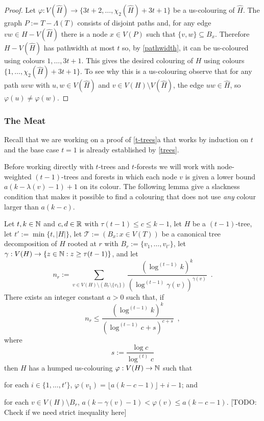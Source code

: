 \documentclass[kpfonts]{patmorin}
\newcommand{\uqs}{\chi_2}
\theoremstyle{named}
\newcommand{\weirdref}[2]{\cref{#1}#2}
\begin{document}
\begin{proof}
    Let $\varphi:V(\hat{H})\to \{3t+2,\ldots,\uqs(\hat{H})+3t+1\}$ be a us-colouring of $\hat{H}$. The graph $P:=T-\Lambda(T)$ consists of disjoint paths and, for any edge $vw\in H-V(\hat{H})$ there is a node $x\in V(P)$ such that $\{v,w\}\subseteq B_x$.  Therefore $H-V(\hat{H})$ has pathwidth at most $t$ so, by \cref{pathwidth}, it can be us-coloured using colours $1,\ldots,3t+1$.  This gives the desired colouring of $H$ using colours $\{1,\ldots,\uqs(\hat{H})+3t+1\}$.  To see why this is a us-colouring observe that for any path $uvw$ with $u,w\in V(\hat{H})$ and $v\in V(H)\setminus V(\hat{H})$, the edge $uw\in\hat{H}$, so $\varphi(u)\neq\varphi(w)$.
\end{proof}

\subsubsection{The Meat}

Recall that we are working on a proof of \weirdref{t-trees}{a} that works by induction on $t$ and the base case $t=1$ is already established by \cref{trees}.

Before working directly with $t$-trees and $t$-forests we will work with node-weighted $(t-1)$-trees and forests in which each node $v$ is given a lower bound $a(k-\lambda(v)-1)+1$ on its colour. The following lemma give a slackness condition that makes it possible to find a colouring that does not use \emph{any} colour larger than $a(k-c)$.

\begin{lem}\label{t-tree-slack}
Let $t,k\in\mathbb{N}$ and $c,d\in\mathbb{R}$  with $\tau(t-1)\le c\le k-1$, let $H$ be a $(t-1)$-tree, let $t':=\min\{t,|H|\}$, let $\mathcal{T}:=(B_x:x\in V(T))$ be a canonical tree decomposition of $H$ rooted at $r$ with $B_r:=\{v_1,\ldots,v_{t'}\}$, let $\gamma:V(H)\to\{z\in\mathbb{N}: z\ge \tau(t-1)\}$, and let
\[
    n_r:=\sum_{v\in V(H)\setminus (B_r\setminus\{v_1\})} \frac{(\log^{(t-1)} k)^k}{(\log^{(t-1)} \gamma(v))^{\gamma(v)}} \enspace .
\]
There exists an integer constant $a>0$ such that,
if
\begin{equation}
     n_r \le \frac{(\log^{(t-1)} k)^k}{(\log^{(t-1)} c + s)^{c+s}} \enspace ,
 \label{total-weight-i}
\end{equation}
where
\[
    s := \frac{\log c}{\log^{(t)} c}
\]
then $H$ has a humped us-colouring $\varphi:V(H)\to\mathbb{N}$ such that
\begin{compactenum}[(P1)]
    \item for each $i\in\{1,\ldots,{t'}\}$, $\varphi(v_1)=\lfloor a(k-c-1)\rfloor+i-1$; and
    \item for each $v\in V(H)\setminus B_r$, $a(k-\gamma(v)-1) < \varphi(v) \le a(k-c-1)$.  [TODO: Check if we need strict inequality here]
\end{compactenum}
\end{lem}
\end{document}
